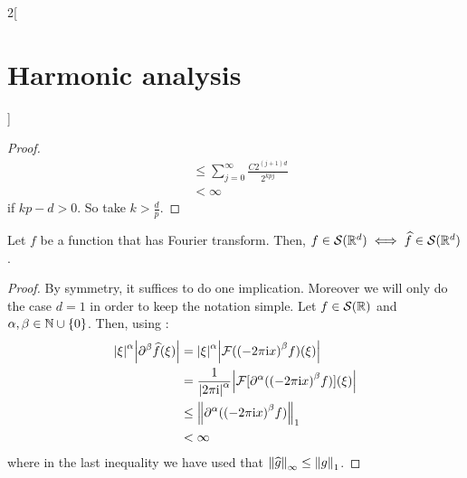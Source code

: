 \documentclass[../../../main_math.tex]{subfiles}
\begin{document}
\begin{multicols}{2}[\section{Harmonic analysis}]
\begin{proof}
\begin{align*}
                                                         & \leq\sum_{j=0}^\infty \frac{C2^{(j+1)d}}{2^{kpj}}       \\
                                                         & <\infty
    \end{align*}
    if $kp-d>0$. So take $k> \frac{d}{p}$.
  \end{proof}
  \begin{lemma}
    Let $f$ be a function that has Fourier transform. Then, $f\in \mathcal{S}(\mathbb{R}^d)\iff \widehat{f} \in \mathcal{S}(\mathbb{R}^d)$.
  \end{lemma}
  \begin{proof}
    By symmetry, it suffices to do one implication. Moreover we will only do the case $d=1$ in order to keep the notation simple. Let $f\in \mathcal{S}(\mathbb{R})$ and $\alpha,\beta\in\mathbb{N}\cup\{0\}$. Then, using :
    \begin{align*}
      \abs{\xi}^\alpha\abs{\partial^\beta \widehat{f}(\xi)} & =\abs{\xi}^\alpha\abs{\mathcal{F}({(-2\pi\mathrm{i} x)}^\beta f)(\xi)}                                 \\
                                                            & =\frac{1}{\abs{2\pi\mathrm{i}}^\alpha}\abs{\mathcal{F}[\partial^\alpha ({(-2\pi\mathrm{i} x)}^\beta f)](\xi)} \\
                                                            & \leq \left\|\partial^\alpha ({(-2\pi\mathrm{i} x)}^\beta f)\right\|_1                                 \\
                                                            & <\infty
    \end{align*}
    where in the last inequality we have used that $\left\|\widehat{g}\right\|_\infty\leq \left\|g\right\|_1$.
  \end{proof}

\end{multicols}
\end{document}

